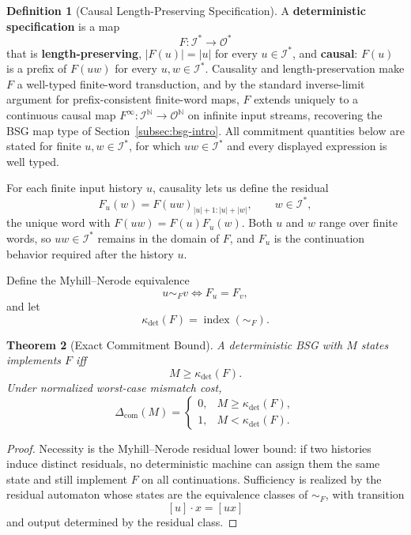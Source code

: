 \documentclass[12pt]{article}
\newtheorem{theorem}{Theorem}[section]
\theoremstyle{definition}
\newtheorem{definition}[theorem]{Definition}
\newcommand{\Com}{\Delta_{\mathrm{com}}}
\begin{document}
\begin{definition}[Causal Length-Preserving Specification]
\label{def:causal-lp-spec}
A \textbf{deterministic specification} is a map
\[
F:\mathcal I^*\to\mathcal O^*
\]
that is \textbf{length-preserving}, $|F(u)|=|u|$ for every $u\in\mathcal I^*$,
and \textbf{causal}: $F(u)$ is a prefix of $F(uw)$ for every
$u,w\in\mathcal I^*$.  Causality and length-preservation make $F$ a
well-typed finite-word transduction, and by the standard inverse-limit
argument for prefix-consistent finite-word maps, $F$ extends uniquely to a
continuous causal map $F^\infty:\mathcal I^{\mathbb N}\to\mathcal O^{\mathbb
N}$ on infinite input streams, recovering the BSG map type of
Section~\ref{subsec:bsg-intro}.  All commitment quantities below are stated
for finite $u,w\in\mathcal I^*$, for which $uw\in\mathcal I^*$ and every
displayed expression is well typed.
\end{definition}

For each finite input history $u$, causality lets us define the residual
\[
F_u(w)=F(uw)_{|u|+1:|u|+|w|},
\qquad w\in\mathcal I^*,
\]
the unique word with $F(uw)=F(u)F_u(w)$.  Both $u$ and $w$ range over finite
words, so $uw\in\mathcal I^*$ remains in the domain of $F$, and $F_u$ is the
continuation behavior required after the history $u$.

Define the Myhill--Nerode equivalence
\[
u\sim_F v
\iff
F_u=F_v,
\]
and let
\[
\kappa_{\det}(F)=\operatorname{index}(\sim_F).
\]

\begin{theorem}[Exact Commitment Bound]
\label{thm:commitment-spec}
A deterministic BSG with $M$ states implements $F$ iff
\[
M\ge\kappa_{\det}(F).
\]
Under normalized worst-case mismatch cost,
\[
\Com(M)=
\begin{cases}
0,&M\ge\kappa_{\det}(F),\\
1,&M<\kappa_{\det}(F).
\end{cases}
\]
\end{theorem}

\begin{proof}
Necessity is the Myhill--Nerode residual lower bound: if two histories induce
distinct residuals, no deterministic machine can assign them the same state and
still implement $F$ on all continuations.  Sufficiency is realized by the
residual automaton whose states are the equivalence classes of $\sim_F$, with
transition
\[
[u]\cdot x=[ux]
\]
and output determined by the residual class.
\end{proof}
\end{document}
